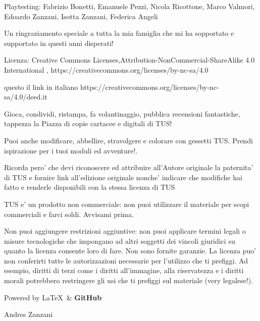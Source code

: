 \documentclass[a4paper,11pt,twoside,openany]{book}
\begin{document}

Playtesting: Fabrizio Bonetti, Emanuele Pezzi, Nicola Ricottone, Marco Valmori, Edoardo Zanzani, Isotta Zanzani, Federica Angeli

\bigskip

Un ringraziamento speciale a tutta la mia famiglia che mi ha sopportato e supportato in questi anni disperati!

\bigskip

Licenza: Creative Commons Licenses,Attribution-NonCommercial-ShareAlike 4.0 International , https://creativecommons.org/licenses/by-nc-sa/4.0

questo il link in italiano https://creativecommons.org/licenses/by-nc-sa/4.0/deed.it

Gioca, condividi, ristampa, fa volantinaggio, pubblica recensioni fantastiche, tappezza la Piazza di copie cartacee e digitali di TUS!

Puoi anche modificare, abbellire, stravolgere e colorare con gessetti TUS. Prendi ispirazione per i tuoi moduli ed avventure!.

Ricorda pero' che devi riconoscere ed attribuire all'Autore originale la paternita' di TUS e fornire link all'edizione originale nonche' indicare che modifiche hai fatto e renderle disponibili con la stessa licenza di TUS

\bigskip
TUS e' un prodotto non commerciale: non puoi utilizzare il materiale per scopi commerciali e farci soldi. Avvisami prima.

\bigskip
Non puoi aggiungere restrizioni aggiuntive: non puoi applicare termini legali o misure tecnologiche che impongano ad altri soggetti dei vincoli giuridici su quanto la licenza consente loro di fare. Non sono fornite garanzie. La licenza puo' non conferirti tutte le autorizzazioni necessarie per l'utilizzo che ti prefiggi. Ad esempio, diritti di terzi come i diritti all'immagine, alla riservatezza e i diritti morali potrebbero restringere gli usi che ti prefiggi sul materiale (very legalese!).

\bigskip

Powered by \Large\LaTeX\ \normalfont\& \Large\textbf{GitHub}

\bigskip

Andres Zanzani


\normalsize

\pagebreak
\end{document}
